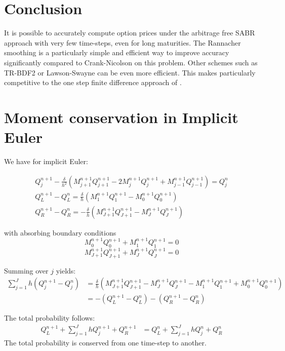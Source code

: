 \documentclass[]{rAMF2e}
\begin{document}
\section{Conclusion}
It is possible to accurately compute option prices under the arbitrage free SABR approach with very few time-steps, even for long maturities. The Rannacher smoothing is a particularly simple and efficient way to improve accuracy significantly compared to Crank-Nicolson on this problem. Other schemes such as TR-BDF2 or Lawson-Swayne can be even more efficient.
This makes \citep{hagan2013arbitrage} particularly competitive to the one step finite difference approach of \citep{andreasen2011zabr}.

%

\newpage
\appendix
\section{Moment conservation in Implicit Euler}
We have for implicit Euler:

\begin{eqnarray}
Q_j^{n+1} - \frac{\delta}{h^2}\left(M_{j+1}^{n+1}Q_{j+1}^{n+1}-2M_j^{n+1}Q_j^{n+1}+M_{j-1}^{n+1}Q_{j-1}^{n+1}\right) = Q_j^n \\
Q_L^{n+1}-Q_L^n = \frac{\delta}{h}\left(M_1^{n+1}Q_1^{n+1}-M_0^{n+1}Q_0^{n+1}\right)\\
Q_R^{n+1}-Q_R^n = -\frac{\delta}{h}\left(M_{J+1}^{n+1}Q_{J+1}^{n+1}-M_{J}^{n+1}Q_J^{n+1}\right)
\end{eqnarray}

with absorbing boundary conditions
$$M_0^{n+1}Q_0^{n+1} + M_1^{n+1}Q_1^{n+1} = 0 $$
$$M_{J+1}^{n+1}Q_{J+1}^{n+1} + M_J^{n+1}Q_J^{n+1} = 0 $$

Summing over $j$ yields:
\begin{align}
\sum_{j=1}^{J} h (Q_j^{n+1}-Q_j^n) &= \frac{\delta}{h}\left(M_{J+1}^{n+1}Q_{J+1}^{n+1}-M_J^{n+1}Q_J^{n+1}-M_1^{n+1}Q_1^{n+1}+M_0^{n+1}Q_0^{n+1}\right)\\
&= -(Q_L^{n+1}-Q_L^n)-(Q_R^{n+1}-Q_R^n)
\end{align}

The total probability follows:
\begin{align}
Q_L^{n+1}+\sum_{j=1}^J hQ_j^{n+1} + Q_R^{n+1} &= Q_L^{n}+\sum_{j=1}^J hQ_j^{n} + Q_R^{n} 
\end{align}
The total probability is conserved from one time-step to another.
\end{document}
